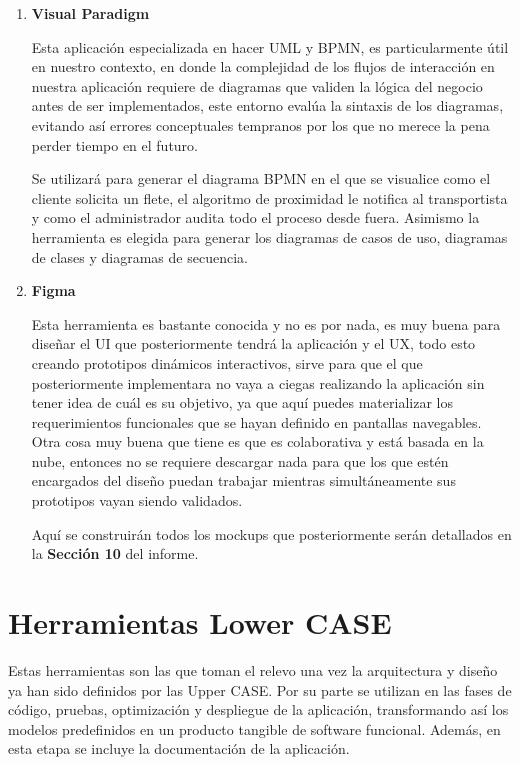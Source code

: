 \begin{enumerate} 
	\item \textbf{Visual Paradigm}
	
	Esta aplicación especializada en hacer UML y BPMN, es particularmente útil en nuestro contexto, en donde la complejidad de los flujos de interacción en nuestra aplicación requiere de diagramas que validen la lógica del negocio antes de ser implementados, este entorno evalúa la sintaxis de los diagramas, evitando así errores conceptuales tempranos por los que no merece la pena perder tiempo en el futuro. 
	
	Se utilizará para generar el diagrama BPMN en el que se visualice como el cliente solicita un flete, el algoritmo de proximidad le notifica al transportista y como el administrador audita todo el proceso desde fuera. Asimismo la herramienta es elegida para generar los diagramas de casos de uso, diagramas de clases y diagramas de secuencia.
	
	\item \textbf{Figma}
	
	Esta herramienta es bastante conocida y no es por nada, es muy buena para diseñar el UI que posteriormente tendrá la aplicación y el UX, todo esto creando prototipos dinámicos interactivos, sirve para que el que posteriormente implementara no vaya a ciegas realizando la aplicación sin tener idea de cuál es su objetivo, ya que aquí puedes materializar los requerimientos funcionales que se hayan definido en pantallas navegables. Otra cosa muy buena que tiene es que es colaborativa y está basada en la nube, entonces no se requiere descargar nada para que los que estén encargados del diseño puedan trabajar mientras simultáneamente sus prototipos vayan siendo validados.
	
	Aquí se construirán todos los mockups que posteriormente serán detallados en la \textbf{Sección 10} del informe.
\end{enumerate}

\section{Herramientas Lower CASE}

Estas herramientas son las que toman el relevo una vez la arquitectura y diseño ya han sido definidos por las Upper CASE. Por su parte se utilizan en las fases de código, pruebas, optimización y despliegue de la aplicación, transformando así los modelos predefinidos en un producto tangible de software funcional. Además, en esta etapa se incluye la documentación de la aplicación.

